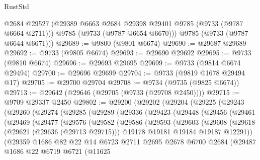 \begin{lexlean}{RustStd}
\begin{coremodule}
        @2684
        @29527
        (@29389 @6663 @2684 @29398 @29401 @9785 (@9733 (@9787 @6664 @2711)))
        @9785
        (@9733 (@9787 @6654 @6670)))
      @9785
      (@9733 (@9787 @6644 @6671)))
@29689 := @9800 (@9801 @6674)
@29690 := @29687 @29689
@29692 := @9733 (@9805 @6674)
@29693 := @29690 @29692
@29695 := @9733 (@9810 @6674)
@29696 := @29693 @29695
@29699 := @9733 (@9814 @6674 @29494)
@29700 := @29696 @29699
@29704 := @9733 (@9819 @1678 @29494 @17)
@29705 := @29700 @29704
@29708 := @9734 (@9735 (@9825 @6674))
@29713 := @29642 (@29646 (@29705 (@9733 (@29708 @2450))))
@29715 := @9709 @29337 @2450
@29802 := @29200
    (@29202
      (@29204
        (@29225
          (@29243
            (@29260
              (@29274
                (@29285
                  (@29289
                    (@29336
                      (@29423
                        (@29448
                          (@29456
                            (@29461
                              (@29469
                                (@29477
                                  (@29576
                                    (@29582
                                      (@29586
                                        (@29593
                                          (@29603
                                            (@29608
                                              (@29618
                                                (@29621 (@29636 (@29713 @29715)))
                                                @19178
                                                @19181
                                                @19184
                                                @19187
                                                @12291))
                                            (@29359
                                              @1686
                                              @82
                                              @22
                                              @14
                                              @6723
                                              @2711
                                              @2695
                                              @2678
                                              @6700
                                              @2684
                                              (@29487
                                                @1686
                                                @22
                                                @6719
                                                @6721
                                                (@11625

\end{coremodule}
\end{lexlean}
